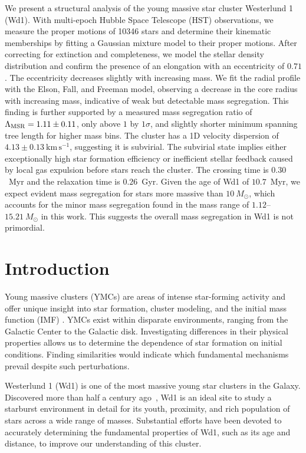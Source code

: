 \documentclass[12pt]{ucsddissertation}
\begin{document}
\begin{CJK*}{UTF8}{gbsn}
We present a structural analysis of the young massive star cluster Westerlund 1 (Wd1). With multi-epoch Hubble Space Telescope (HST) observations, we measure the proper motions of \num{10346} stars and determine their kinematic memberships by fitting a Gaussian mixture model to their proper motions. After correcting for extinction and completeness, we model the stellar density distribution and confirm the presence of an elongation with an eccentricity of $0.71$. The eccentricity decreases slightly with increasing mass. We fit the radial profile with the Elson, Fall, and Freeman model, observing a decrease in the core radius with increasing mass, indicative of weak but detectable mass segregation. This finding is further supported by a measured mass segregation ratio of $\Lambda_\mathrm{\rm MSR}=1.11\pm0.11$, only above $1$ by $1\sigma$, and slightly shorter minimum spanning tree length for higher mass bins. The cluster has a 1D velocity dispersion of $4.13 \pm 0.13~\mathrm{km}\,\mathrm{s}^{-1}$, suggesting it is subvirial. The subvirial state implies either exceptionally high star formation efficiency or inefficient stellar feedback caused by local gas expulsion before stars reach the cluster. The crossing time is $0.30$~Myr and the relaxation time is $0.26$~Gyr. Given the age of Wd1 of $10.7$~Myr, we expect evident mass segregation for stars more massive than $10~M_\odot$, which accounts for the minor mass segregation found in the mass range of $1.12$--$15.21~M_\odot$ in this work. This suggests the overall mass segregation in Wd1 is not primordial.

\section{Introduction}
\label{wd1-sec:introduction}

Young massive clusters (YMCs) are areas of intense star-forming activity and offer unique insight into star formation, cluster modeling, and the initial mass function (IMF) \citep{PortegiesZwart-2010}. YMCs exist within disparate environments, ranging from the Galactic Center to the Galactic disk. Investigating differences in their physical properties allows us to determine the dependence of star formation on initial conditions. Finding similarities would indicate which fundamental mechanisms prevail despite such perturbations.  

Westerlund 1 (Wd1) is one of the most massive young star clusters in the Galaxy. Discovered more than half a century ago~\citep{Westerlund-1961}, Wd1 is an ideal site to study a starburst environment in detail for its youth, proximity, and rich population of stars across a wide range of masses. Substantial efforts have been devoted to accurately determining the fundamental properties of Wd1, such as its age and distance, to improve our understanding of this cluster.


\end{CJK*}
\end{document}
